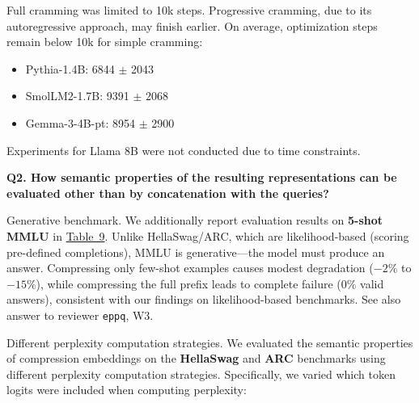 Full cramming was limited to 10k steps. Progressive cramming, due to its autoregressive approach, may finish earlier. On average, optimization steps remain below 10k for simple cramming:

\begin{itemize}
    \item Pythia-1.4B: 6844 {\small $\pm$ 2043}
    \item SmolLM2-1.7B: 9391 {\small $\pm$ 2068}
    \item Gemma-3-4B-pt: 8954 {\small $\pm$ 2900}
\end{itemize}

Experiments for Llama 8B were not conducted due to time constraints.

\textbf{Q2. How semantic properties of the resulting representations can be evaluated other than by concatenation with the queries?}

Generative benchmark. We additionally report evaluation results on \textbf{5-shot MMLU} in \href{https://drive.google.com/file/d/1_NJSBkvhEyUdA45HD2QD8IxIEaQEpb9t/view?usp=sharing}{Table~9}. Unlike HellaSwag/ARC, which are likelihood-based (scoring pre-defined completions), MMLU is generative—the model must produce an answer. Compressing only few-shot examples causes modest degradation ($-2\%$ to $-15\%$), while compressing the full prefix leads to complete failure ($0\%$ valid answers), consistent with our findings on likelihood-based benchmarks. See also answer to reviewer \texttt{eppq}, W3.

Different perplexity computation strategies. We evaluated the semantic properties of compression embeddings on the \textbf{HellaSwag} and \textbf{ARC} benchmarks using different perplexity computation strategies. Specifically, we varied which token logits were included when computing perplexity:


